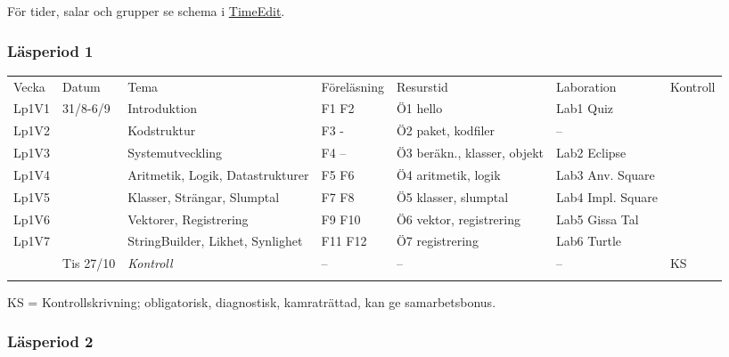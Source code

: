 För tider, salar och grupper se schema i
\href{http://cs.lth.se/eda016/schema}{TimeEdit}.

\subsubsection{Läsperiod 1}\label{lasperiod-1}

\begin{longtable}[c]{@{}lllllll@{}}
\toprule\addlinespace
Vecka & Datum & Tema & Föreläsning & Resurstid & Laboration & Kontroll
\\\addlinespace
\midrule\endhead
Lp1V1 & 31/8-6/9 & Introduktion & F1 F2 & Ö1 hello & Lab1 Quiz &
\\\addlinespace
Lp1V2 & & Kodstruktur & F3 - & Ö2 paket, kodfiler & -- &
\\\addlinespace
Lp1V3 & & Systemutveckling & F4 -- & Ö3 beräkn., klasser, objekt & Lab2
Eclipse &
\\\addlinespace
Lp1V4 & & Aritmetik, Logik, Datastrukturer & F5 F6 & Ö4 aritmetik, logik
& Lab3 Anv. Square &
\\\addlinespace
Lp1V5 & & Klasser, Strängar, Slumptal & F7 F8 & Ö5 klasser, slumptal &
Lab4 Impl. Square &
\\\addlinespace
Lp1V6 & & Vektorer, Registrering & F9 F10 & Ö6 vektor, registrering &
Lab5 Gissa Tal &
\\\addlinespace
Lp1V7 & & StringBuilder, Likhet, Synlighet & F11 F12 & Ö7 registrering &
Lab6 Turtle &
\\\addlinespace
& Tis 27/10 & \emph{Kontroll} & -- & -- & -- & KS
\\\addlinespace
\bottomrule
\end{longtable}

KS = Kontrollskrivning; obligatorisk, diagnostisk, kamraträttad, kan ge
samarbetsbonus.

\subsubsection{Läsperiod 2}\label{lasperiod-2}

